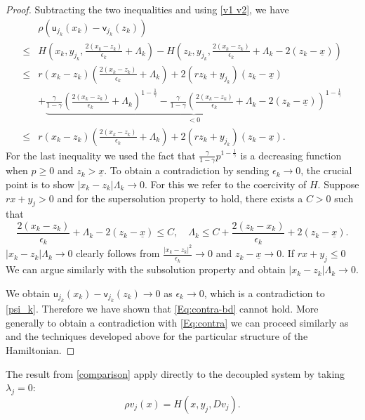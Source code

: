 \documentclass[11pt]{article}
\numberwithin{equation}{section}
\theoremstyle{Claim}
\newcommand{\ux}{{\underline x}}
\newcommand{\beq}{\begin{equation}}
\newcommand{\eeq}{\end{equation}}
\newcommand{\e}{\epsilon}
\theoremstyle{plain}
\begin{document}
\begin{proof}
Subtracting the two inequalities and using \cref{v1 v2}, we have 
\beq
\begin{aligned}
&\rho (\mathsf{u}_{j_{k}}(x_{k})-\mathsf{v}_{j_{k}}(z_{k}))\\
\leq {}&H\left(x_{k},y_{j_{k}},\frac{2( x_{k}-z_{k} )}{\e_k}+\Lambda_k \right)-H\left(z_{k},y_{j_{k}},\frac{2( x_{k}-z_{k} )}{\e_k}+\Lambda_k-2(z_{k}-\ux) \right)\\
\leq {}& r(x_{k}-z_{k})\left(\frac{2( x_{k}-z_{k} )}{\e_k}+\Lambda_k\right)+2(rz_{k}+y_{j_{k}})(z_{k}-\ux)\\
&+\underbrace{\frac \gamma {1-\gamma}\left(\frac{2( x_{k}-z_{k} )}{\e_k}+\Lambda_k \right)^{1-\frac 1 \gamma}
-\frac \gamma {1-\gamma}\left(\frac{2( x_{k}-z_{k} )}{\e_k}+\Lambda_k-2(z_{k}-\ux) \right)^{1-\frac 1 \gamma}}_{<0}\\
\leq {}& r(x_{k}-z_{k})\left(\frac{2( x_{k}-z_{k} )}{\e_k}+\Lambda_k\right)+2(rz_{k}+y_{j_{k}})(z_k-\ux).
\end{aligned}
\eeq
For the last inequality we used the fact that $\frac \gamma {1-\gamma}p^{1-\frac 1 \gamma}$ is a decreasing function when $p\geq 0$ and $z_k>\ux$. To obtain a contradiction by sending $\e_k \to 0$, the crucial point is to show $\vert x_{k}-z_{k}\vert \Lambda_k\to 0$. For this we refer to the coercivity of $H$. Suppose $rx+y_j>0$ and for the supersolution property to hold, there exists a $C>0$ such that 
$$
\frac{2( x_{k}-z_{k} )}{\e_k}+\Lambda_k-2(z_{k}-\ux) \leq C,
\quad
\Lambda_k \leq C+\frac{2( z_{k}-x_{k} )}{\e_k}+2(z_{k}-\ux).
$$
$\vert x_{k}-z_{k}\vert \Lambda_k\to 0$ clearly follows from $\frac{\vert x_{k}-z_{k}\vert^2}{\e_k}\to 0$ and $ z_{k}-\ux \to 0$. If $rx+y_j\leq 0$ We can argue similarly with the subsolution property and obtain $\vert x_{k}-z_{k}\vert \Lambda_k\to 0$.\par
We obtain $\mathsf{u}_{j_{k}}(x_{k})-\mathsf{v}_{j_{k}}(z_{k})\to 0$ as $\e_k\to 0$, which is a contradiction to \cref{psi_k}. Therefore we have shown that \cref{Eq:contra-bd} cannot hold. More generally to obtain a contradiction with \cref{Eq:contra} we can proceed similarly as \cite[proof of Theorem 2.4 and Theorem 4.2]{barles1994solutions} and the techniques developed above for the particular structure of the Hamiltonian.
\end{proof}
The result from \cref{comparison} apply directly to the decoupled system by taking $\lambda_j=0$:
\begin{equation}\label{eq:HJB1d}
\rho v_j(x) = H(x, y_j, Dv_j).
\end{equation}
\end{document}
